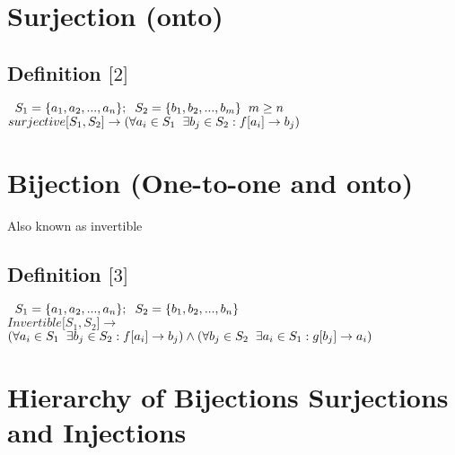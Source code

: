 \documentclass[11pt]{article}
\begin{document}
\section{Surjection (onto)}
\subsection{Definition $\lbrack 2 \rbrack$}
\begin{center}
$\hspace{2mm} S_1 = \{a_1,a_2,...,a_n\}; \hspace{2mm} S_2 = \{b_1,b_2,...,b_m\} \hspace{2mm} m \geq n$
\\ \vspace{2mm}
$surjective \lbrack S_1, S_2 \rbrack \rightarrow (\forall a_i \in S_1 \hspace{2mm} \exists b_j \in S_2 : f \lbrack a_i \rbrack \rightarrow b_j)$
\end{center}







\section{Bijection (One-to-one and onto)}
Also known as invertible

\subsection{Definition $\lbrack 3 \rbrack$}
\begin{center}
$\hspace{2mm} S_1 = \{a_1,a_2,...,a_n\}; \hspace{2mm} S_2 = \{b_1,b_2,...,b_n\}$
\\ \vspace{2mm}
$Invertible \lbrack S_1,S_2 \rbrack \rightarrow$
\\ \vspace{2mm}
$ (\forall a_i \in S_1 \hspace{2mm} \exists b_j \in S_2 : f \lbrack a_i \rbrack \rightarrow b_j) \land (\forall b_j \in S_2 \hspace{2mm} \exists a_i \in S_1 : g \lbrack b_j \rbrack \rightarrow a_i)$
\end{center}




\section{Hierarchy of Bijections Surjections and Injections}
\end{document}
